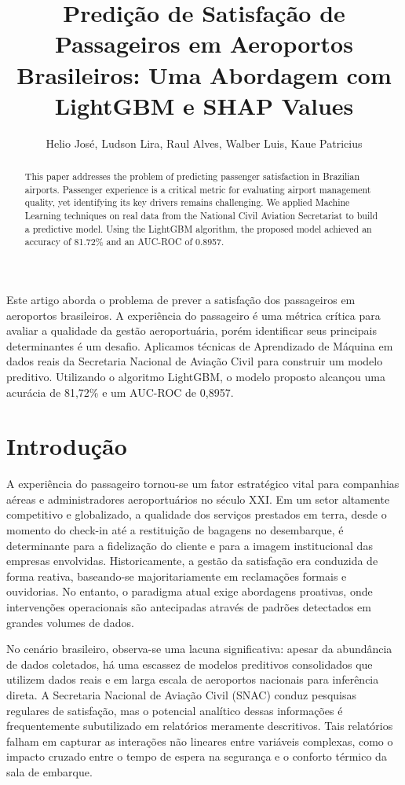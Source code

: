 \documentclass[12pt]{article}
\title{Predição de Satisfação de Passageiros em Aeroportos Brasileiros: Uma Abordagem com LightGBM e SHAP Values}
\author{Helio José\inst{1}, Ludson Lira\inst{1}, Raul Alves\inst{1}, Walber Luis\inst{1}, Kaue Patricius\inst{1}}
\begin{document}
 

\maketitle

\begin{abstract}
  This paper addresses the problem of predicting passenger satisfaction in Brazilian airports. Passenger experience is a critical metric for evaluating airport management quality, yet identifying its key drivers remains challenging. We applied Machine Learning techniques on real data from the National Civil Aviation Secretariat to build a predictive model. Using the LightGBM algorithm, the proposed model achieved an accuracy of 81.72\% and an AUC-ROC of 0.8957.
\end{abstract}
     
\begin{resumo} 
  Este artigo aborda o problema de prever a satisfação dos passageiros em aeroportos brasileiros. A experiência do passageiro é uma métrica crítica para avaliar a qualidade da gestão aeroportuária, porém identificar seus principais determinantes é um desafio. Aplicamos técnicas de Aprendizado de Máquina em dados reais da Secretaria Nacional de Aviação Civil para construir um modelo preditivo. Utilizando o algoritmo LightGBM, o modelo proposto alcançou uma acurácia de 81,72\% e um AUC-ROC de 0,8957.
\end{resumo}


\section{Introdução}

A experiência do passageiro tornou-se um fator estratégico vital para companhias aéreas e administradores aeroportuários no século XXI. Em um setor altamente competitivo e globalizado, a qualidade dos serviços prestados em terra, desde o momento do check-in até a restituição de bagagens no desembarque, é determinante para a fidelização do cliente e para a imagem institucional das empresas envolvidas. Historicamente, a gestão da satisfação era conduzida de forma reativa, baseando-se majoritariamente em reclamações formais e ouvidorias. No entanto, o paradigma atual exige abordagens proativas, onde intervenções operacionais são antecipadas através de padrões detectados em grandes volumes de dados.

No cenário brasileiro, observa-se uma lacuna significativa: apesar da abundância de dados coletados, há uma escassez de modelos preditivos consolidados que utilizem dados reais e em larga escala de aeroportos nacionais para inferência direta. A Secretaria Nacional de Aviação Civil (SNAC) conduz pesquisas regulares de satisfação, mas o potencial analítico dessas informações é frequentemente subutilizado em relatórios meramente descritivos. Tais relatórios falham em capturar as interações não lineares entre variáveis complexas, como o impacto cruzado entre o tempo de espera na segurança e o conforto térmico da sala de embarque.
\end{document}
